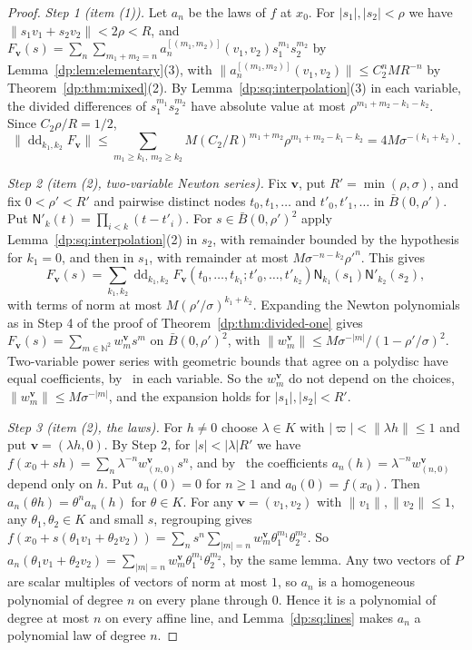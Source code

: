 \documentclass[11pt]{amsart}
\theoremstyle{definition}
\theoremstyle{remark}
\numberwithin{equation}{section}
\newcommand{\N}{\mathbb N}
\newcommand{\abs}[1]{\lvert #1\rvert}
\newcommand{\norm}[1]{\lVert #1\rVert}
\theoremstyle{plain}
\theoremstyle{definition}
\theoremstyle{plain}
\begin{document}
\begin{proof}
\emph{Step 1 (item (1)).} Let $a_n$ be the laws of $f$ at $x_0$. For $\abs{s_1},\abs{s_2}<\rho$ we have $\norm{s_1v_1+s_2v_2}<2\rho<R$, and $F_{\mathbf v}(s)=\sum_n\sum_{m_1+m_2=n}a_n^{[(m_1,m_2)]}(v_1,v_2)s_1^{m_1}s_2^{m_2}$ by Lemma~\ref{dp:lem:elementary}(3), with $\norm{a_n^{[(m_1,m_2)]}(v_1,v_2)}\le C_2^nMR^{-n}$ by Theorem~\ref{dp:thm:mixed}(2). By Lemma~\ref{dp:sq:interpolation}(3) in each variable, the divided differences of $s_1^{m_1}s_2^{m_2}$ have absolute value at most $\rho^{m_1+m_2-k_1-k_2}$. Since $C_2\rho/R=1/2$,
\[
 \norm{\operatorname{dd}_{k_1,k_2}F_{\mathbf v}}\le\sum_{m_1\ge k_1,\,m_2\ge k_2}M(C_2/R)^{m_1+m_2}\rho^{m_1+m_2-k_1-k_2}=4M\sigma^{-(k_1+k_2)}.
\]

\emph{Step 2 (item (2), two-variable Newton series).} Fix $\mathbf v$, put $R'=\min(\rho,\sigma)$, and fix $0<\rho'<R'$ and pairwise distinct nodes $t_0,t_1,\dots$ and $t'_0,t'_1,\dots$ in $\bar B(0,\rho')$. Put $\mathsf N'_k(t)=\prod_{i<k}(t-t'_i)$. For $s\in\bar B(0,\rho')^2$ apply Lemma~\ref{dp:sq:interpolation}(2) in $s_2$, with remainder bounded by the hypothesis for $k_1=0$, and then in $s_1$, with remainder at most $M\sigma^{-n-k_2}\rho'^n$. This gives
\[
 F_{\mathbf v}(s)=\sum_{k_1,k_2}\operatorname{dd}_{k_1,k_2}F_{\mathbf v}(t_0,\dots,t_{k_1};t'_0,\dots,t'_{k_2})\mathsf N_{k_1}(s_1)\mathsf N'_{k_2}(s_2),
\]
with terms of norm at most $M(\rho'/\sigma)^{k_1+k_2}$. Expanding the Newton polynomials as in Step 4 of the proof of Theorem~\ref{dp:thm:divided-one} gives $F_{\mathbf v}(s)=\sum_{m\in\N^2}w^{\mathbf v}_ms^m$ on $\bar B(0,\rho')^2$, with $\norm{w^{\mathbf v}_m}\le M\sigma^{-\abs m}/(1-\rho'/\sigma)^2$. Two-variable power series with geometric bounds that agree on a polydisc have equal coefficients, by~\cite[Lemma~A.1]{I} in each variable. So the $w^{\mathbf v}_m$ do not depend on the choices, $\norm{w^{\mathbf v}_m}\le M\sigma^{-\abs m}$, and the expansion holds for $\abs{s_1},\abs{s_2}<R'$.

\emph{Step 3 (item (2), the laws).} For $h\ne0$ choose $\lambda\in K$ with $\abs\varpi<\norm{\lambda h}\le1$ and put $\mathbf v=(\lambda h,0)$. By Step 2, for $\abs s<\abs\lambda R'$ we have $f(x_0+sh)=\sum_n\lambda^{-n}w^{\mathbf v}_{(n,0)}s^n$, and by~\cite[Lemma~A.1]{I} the coefficients $a_n(h)=\lambda^{-n}w^{\mathbf v}_{(n,0)}$ depend only on $h$. Put $a_n(0)=0$ for $n\ge1$ and $a_0(0)=f(x_0)$. Then $a_n(\theta h)=\theta^na_n(h)$ for $\theta\in K$. For any $\mathbf v=(v_1,v_2)$ with $\norm{v_1},\norm{v_2}\le1$, any $\theta_1,\theta_2\in K$ and small $s$, regrouping gives $f(x_0+s(\theta_1v_1+\theta_2v_2))=\sum_ns^n\sum_{\abs m=n}w^{\mathbf v}_m\theta_1^{m_1}\theta_2^{m_2}$. So $a_n(\theta_1v_1+\theta_2v_2)=\sum_{\abs m=n}w^{\mathbf v}_m\theta_1^{m_1}\theta_2^{m_2}$, by the same lemma. Any two vectors of $P$ are scalar multiples of vectors of norm at most $1$, so $a_n$ is a homogeneous polynomial of degree $n$ on every plane through $0$. Hence it is a polynomial of degree at most $n$ on every affine line, and Lemma~\ref{dp:sq:lines} makes $a_n$ a polynomial law of degree $n$.


\end{proof}
\end{document}
